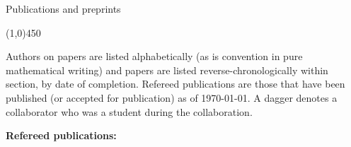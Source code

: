 \documentclass[10pt]{article}
\begin{document}
\bigskip
\noindent
{\large \sc Publications and preprints}

\vspace{-0.1in}
\noindent
\line(1,0){450}

\smallskip

\noindent Authors on papers are listed alphabetically (as is convention in pure mathematical writing)
and papers are listed reverse-chronologically within section, by date of completion.
Refereed publications are those that have been published 
(or accepted for publication) as of \today.
A dagger\textsuperscript{\textdagger} denotes a collaborator who was a student during the collaboration.

\medskip

\noindent\textbf{Refereed publications:}
\end{document}
